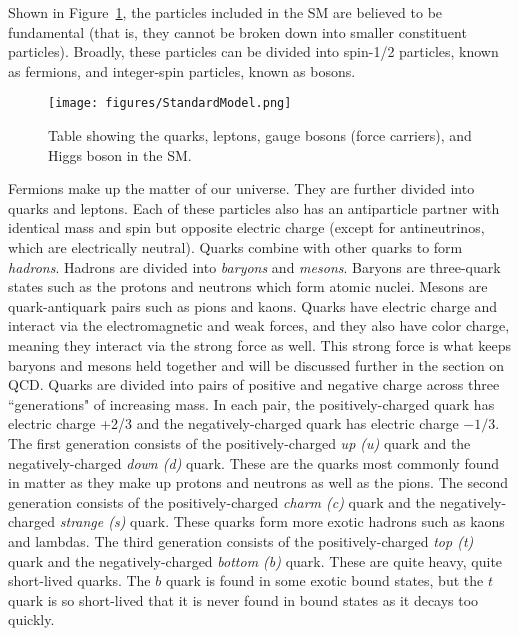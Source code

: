 Shown in Figure~\ref{fig:StandardModel}, the particles included in the SM are believed to be fundamental (that is, they cannot be broken down into smaller constituent particles). Broadly, these particles can be divided into spin-1/2 particles, known as fermions, and integer-spin particles, known as bosons. 

\begin{figure}
\centering
  \texttt{[image: figures/StandardModel.png]}
  \caption{\label{fig:StandardModel} Table showing the quarks, leptons, gauge bosons (force carriers), and Higgs boson in the SM\cite{StandardModelTable}.}
\end{figure}


Fermions make up the matter of our universe. They are further divided into quarks and leptons. Each of these particles also has an antiparticle partner with identical mass and spin but opposite electric charge (except for antineutrinos, which are electrically neutral). Quarks combine with other quarks to form \textit{hadrons}. Hadrons are divided into \textit{baryons} and \textit{mesons}. Baryons are three-quark states such as the protons and neutrons which form atomic nuclei. Mesons are quark-antiquark pairs such as pions and kaons. Quarks have electric charge and interact via the electromagnetic and weak forces, and they also have color charge, meaning they interact via the strong force as well. This strong force is what keeps baryons and mesons held together and will be discussed further in the section on QCD. Quarks are divided into pairs of positive and negative charge across three ``generations" of increasing mass. In each pair, the positively-charged quark has electric charge +2/3 and the negatively-charged quark has electric charge $-1/3$. The first generation consists of the positively-charged \textit{up (u)} quark and the negatively-charged \textit{down (d)} quark. These are the quarks most commonly found in matter as they make up protons and neutrons as well as the pions. The second generation consists of the positively-charged \textit{charm (c)} quark and the negatively-charged \textit{strange (s)} quark. These quarks form more exotic hadrons such as kaons and lambdas. The third generation consists of the positively-charged \textit{top (t)} quark and the negatively-charged \textit{bottom (b)} quark. These are quite heavy, quite short-lived quarks. The  $b$ quark is found in some exotic bound states, but the $t$ quark is so short-lived that it is never found in bound states as it decays too quickly.

